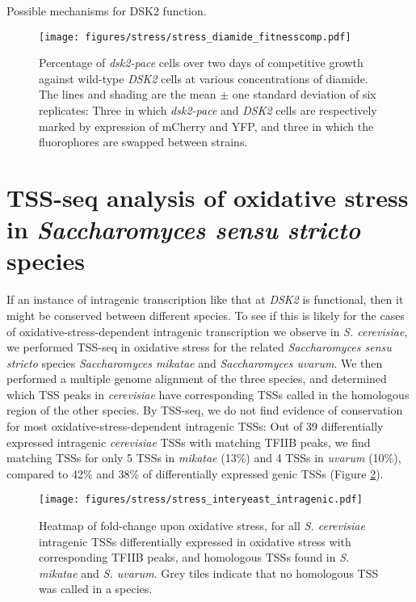 Possible mechanisms for DSK2 function.

\begin{figure}
    \texttt{[image: figures/stress/stress\_diamide\_fitnesscomp.pdf]}
    \caption[Percentage of \textit{dsk2-pace} cells over two days of competitive growth against wild-type \textit{DSK2} cells at various concentrations of diamide.]{Percentage of \textit{dsk2-pace} cells over two days of competitive growth against wild-type \textit{DSK2} cells at various concentrations of diamide. The lines and shading are the mean $\pm$ one standard deviation of six replicates: Three in which \textit{dsk2-pace} and \textit{DSK2} cells are respectively marked by expression of mCherry and YFP, and three in which the fluorophores are swapped between strains.}
    \label{fig:stress_diamide_fitnesscomp}
\end{figure}

\section{TSS-seq analysis of oxidative stress in \textit{Saccharomyces sensu stricto} species}

If an instance of intragenic transcription like that at \textit{DSK2} is functional, then it might be conserved between different species.
To see if this is likely for the cases of oxidative-stress-dependent intragenic transcription we observe in \textit{S. cerevisiae}, we performed TSS-seq in oxidative stress for the related \textit{Saccharomyces sensu stricto} species \textit{Saccharomyces mikatae} and \textit{Saccharomyces uvarum}.
We then performed a multiple genome alignment of the three species, and determined which TSS peaks in \textit{cerevisiae} have corresponding TSSs called in the homologous region of the other species.
By TSS-seq, we do not find evidence of conservation for most oxidative-stress-dependent intragenic TSSs: Out of 39 differentially expressed intragenic \textit{cerevisiae} TSSs with matching TFIIB peaks, we find matching TSSs for only 5 TSSs in \textit{mikatae} (13\%) and 4 TSSs in \textit{uvarum} (10\%), compared to 42\% and 38\% of differentially expressed genic TSSs (Figure \ref{fig:stress_interyeast_intragenic}).

\begin{figure}
    \texttt{[image: figures/stress/stress\_interyeast\_intragenic.pdf]}
    \caption[Heatmap of fold-change upon oxidative stress, for \textit{S. cerevisiae} intragenic TSSs differentially expressed in oxidative stress, and homologous TSSs found in \textit{S. mikatae} and \textit{S. uvarum}.]{Heatmap of fold-change upon oxidative stress, for all \textit{S. cerevisiae} intragenic TSSs differentially expressed in oxidative stress with corresponding TFIIB peaks, and homologous TSSs found in \textit{S. mikatae} and \textit{S. uvarum}. Grey tiles indicate that no homologous TSS was called in a species.}
    \label{fig:stress_interyeast_intragenic}
\end{figure}


